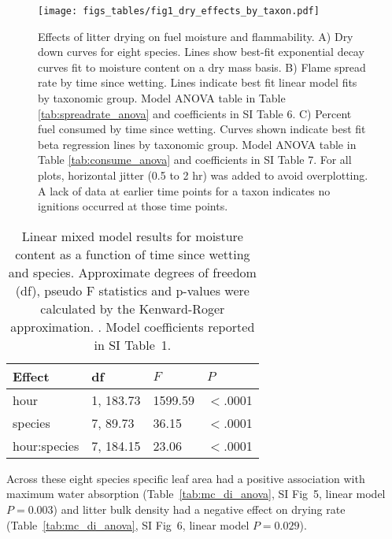 \documentclass[letterpaper,12pt]{article}
\begin{document}
\begin{figure}[h]
  \centering
\texttt{[image: figs\_tables/fig1\_dry\_effects\_by\_taxon.pdf]}
\caption{Effects of litter drying on fuel moisture and flammability. A) Dry
  down curves for eight species. Lines show best-fit exponential decay curves
  fit to moisture content on a dry mass basis. B) Flame spread rate by time
  since wetting. Lines indicate best fit linear model fits by taxonomic group.
  Model ANOVA table in Table \ref{tab:spreadrate_anova} and coefficients in SI
  Table 6. C) Percent fuel consumed by time since wetting. Curves shown
  indicate best fit beta regression lines by taxonomic group. Model ANOVA table
  in Table \ref{tab:consume_anova} and coefficients in SI Table 7. For all
  plots, horizontal jitter (0.5 to 2 hr) was added to avoid overplotting. A
  lack of data at earlier time points for a taxon indicates no ignitions
  occurred at those time points. }
 \label{fig:drydown}
\end{figure}


\begin{table}[h]
  \caption{Linear mixed model results for moisture content as a function of
    time since wetting and species. Approximate degrees of freedom (df), pseudo F
    statistics and p-values were calculated by the Kenward-Roger approximation.
    \citep{Kenward_Roger-1997}. Model coefficients reported in SI Table~1.}
  \label{tab:drydown}
\centering
\begin{tabular}{llll}
  \toprule
Effect & df & $F$ & $P$ \\ 
  \midrule
  hour & 1, 183.73 & 1599.59 & $<$.0001 \\ 
  species & 7, 89.73 & 36.15 & $<$.0001 \\ 
  hour:species & 7, 184.15 & 23.06 & $<$.0001 \\ 
   \bottomrule
\end{tabular}
\end{table}

Across these eight species specific leaf area had a positive association with
maximum water absorption (Table~\ref{tab:mc_di_anova}, SI Fig~5, linear model
$P = 0.003$) and litter bulk density had a negative effect on drying rate
(Table~\ref{tab:mc_di_anova}, SI Fig~6, linear model $P = 0.029$).
\end{document}
